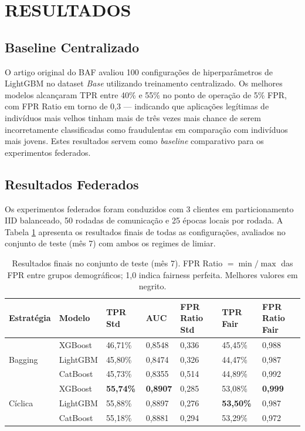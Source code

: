 \section{RESULTADOS}

\subsection{Baseline Centralizado}

O artigo original do BAF \cite{jesus2022baf} avaliou 100 configurações de hiperparâmetros de LightGBM no dataset \textit{Base} utilizando treinamento centralizado. Os melhores modelos alcançaram TPR entre 40\% e 55\% no ponto de operação de 5\% FPR, com FPR Ratio em torno de 0,3 --- indicando que aplicações legítimas de indivíduos mais velhos tinham mais de três vezes mais chance de serem incorretamente classificadas como fraudulentas em comparação com indivíduos mais jovens. Estes resultados servem como \textit{baseline} comparativo para os experimentos federados.

\subsection{Resultados Federados}

Os experimentos federados foram conduzidos com 3 clientes em particionamento IID balanceado, 50 rodadas de comunicação e 25 épocas locais por rodada. A Tabela \ref{tab:resultados_federados} apresenta os resultados finais de todas as configurações, avaliados no conjunto de teste (mês 7) com ambos os regimes de limiar.

\begin{table}[H]
\centering
\small
\begin{tabularx}{\textwidth}{|l|l|X|X|X|X|X|}
\hline
\bf Estratégia & \bf Modelo & \bf TPR Std & \bf AUC & \bf FPR Ratio Std & \bf TPR Fair & \bf FPR Ratio Fair \\ \hline
\multirow{3}{*}{Bagging} & XGBoost & 46,71\% & 0,8548 & 0,336 & 45,45\% & 0,988 \\ \cline{2-7}
 & LightGBM & 45,80\% & 0,8474 & 0,326 & 44,47\% & 0,987 \\ \cline{2-7}
 & CatBoost & 45,73\% & 0,8355 & 0,514 & 44,89\% & 0,992 \\ \hline
\multirow{3}{*}{Cíclica} & XGBoost & \textbf{55,74\%} & \textbf{0,8907} & 0,285 & 53,08\% & \textbf{0,999} \\ \cline{2-7}
 & LightGBM & 55,88\% & 0,8897 & 0,276 & \textbf{53,50\%} & 0,987 \\ \cline{2-7}
 & CatBoost & 55,18\% & 0,8881 & 0,294 & 53,29\% & 0,972 \\ \hline
\end{tabularx}
\caption{Resultados finais no conjunto de teste (mês 7). FPR Ratio $= \min/\max$ das FPR entre grupos demográficos; 1,0 indica fairness perfeita. Melhores valores em negrito.}
\label{tab:resultados_federados}
\end{table}

